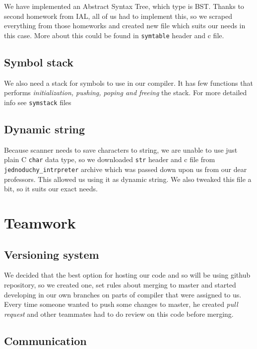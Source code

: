 \documentclass[11pt, titlepage]{article}
\begin{document}
We have implemented an Abstract Syntax Tree, which type is BST. Thanks
to second homework from IAL, all of us had to implement this, so we
scraped everything from those homeworks and created new file which suits
our needs in this case. More about this could be found in
\texttt{symtable} header and c file.

\subsection{Symbol stack}\label{symbol-stack}

We also need a stack for symbols to use in our compiler. It has few
functions that performs \emph{initialization, pushing, poping and
freeing} the stack. For more detailed info see \texttt{symstack}
files

\subsection{Dynamic string}\label{dynamic-string}

Because scanner needs to save characters to string, we are unable to use
just plain C \texttt{char} data type, so we downloaded \texttt{str}
header and c file from \texttt{jednoduchy\_intrpreter} archive which was
passed down upon us from our dear professors. This allowed us using it as
dynamic string. We also tweaked this file a bit, so it suits our exact needs.




\section{Teamwork}\label{teamwork}

\subsection{Versioning system}\label{versioning-system}

We decided that the best option for hosting our code and so will be
using github repository, so we created one, set rules about merging to
master and started developing in our own branches on parts of compiler
that were assigned to us. Every time someone wanted to push some changes
to master, he created \emph{pull request} and other teammates had to do
review on this code before merging.

\subsection{Communication}\label{communication}
\end{document}
